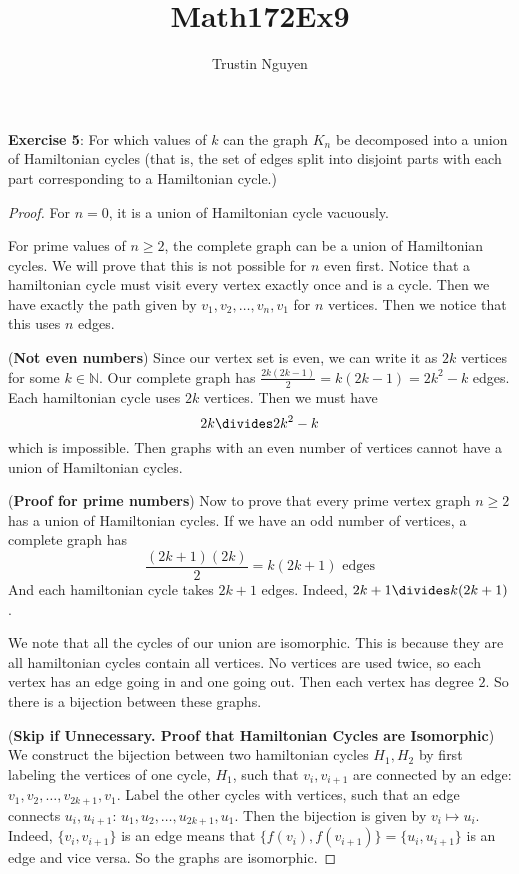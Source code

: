 \documentclass{article}
\title{Math172Ex9}
\author{Trustin Nguyen}
\begin{document}
    \maketitle

\reversemarginpar

\textbf{Exercise 5}: For which values of $k$ can the graph $K_{n}$ be decomposed into a union of Hamiltonian cycles (that is, the set of edges split into disjoint parts with each part corresponding to a Hamiltonian cycle.)
    \begin{proof}
        For $n = 0$, it is a union of Hamiltonian cycle vacuously.

        For prime values of $n \geq 2$, the complete graph can be a union of Hamiltonian cycles. We will prove that this is not possible for $n$ even first. Notice that a hamiltonian cycle must visit every vertex exactly once and is a cycle. Then we have exactly the path given by $v_{1}, v_{2}, \ldots, v_{n}, v_{1}$ for $n$ vertices. Then we notice that this uses $n$ edges. 

        (\textbf{Not even numbers}) Since our vertex set is even, we can write it as $2k$ vertices for some $k \in \mathbb{N}$. Our complete graph has $\frac{2k(2k - 1)}{2} = k(2k - 1) = 2k^{2} - k$ edges. Each hamiltonian cycle uses $2k$ vertices. Then we must have 
            \begin{equation*}
                2k \divides 2k^{2} - k
            \end{equation*}
        which is impossible. Then graphs with an even number of vertices cannot have a union of Hamiltonian cycles.

        (\textbf{Proof for prime numbers}) Now to prove that every prime vertex graph $n \geq 2$ has a union of Hamiltonian cycles. If we have an odd number of vertices, a complete graph has
            \begin{equation*}
                \dfrac{(2k + 1)(2k)}{2} = k(2k + 1) \text{ edges}
            \end{equation*}
        And each hamiltonian cycle takes $2k + 1$ edges. Indeed, $2k + 1 \divides k(2k + 1)$.

        We note that all the cycles of our union are isomorphic. This is because they are all hamiltonian cycles contain all vertices. No vertices are used twice, so each vertex has an edge going in and one going out. Then each vertex has degree $2$. So there is a bijection between these graphs. 

        (\textbf{Skip if Unnecessary. Proof that Hamiltonian Cycles are Isomorphic}) We construct the bijection between two hamiltonian cycles $H_{1}, H_{2}$ by first labeling the vertices of one cycle, $H_{1}$, such that $v_{i}, v_{i + 1}$ are connected by an edge: $v_{1}, v_{2}, \ldots, v_{2k + 1}, v_{1}$. Label the other cycles with vertices, such that an edge connects $u_{i}, u_{i + 1}$: $u_{1}, u_{2}, \ldots, u_{2k + 1}, u_{1}$. Then the bijection is given by $v_{i} \mapsto u_{i}$. Indeed, $\{v_{i}, v_{i + 1}\}$ is an edge means that $\{f(v_{i}), f(v_{i + 1})\} = \{u_{i}, u_{i + 1}\}$ is an edge and vice versa. So the graphs are isomorphic.


\end{proof}
\end{document}
